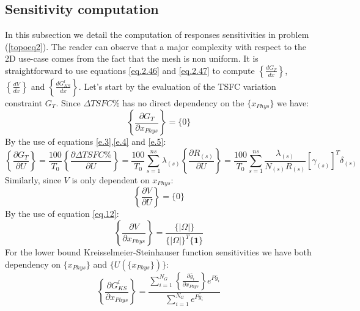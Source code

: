  \subsection{Sensitivity computation}
 \label{subsec2.4}
 In this subsection we detail the computation of responses sensitivities in problem (\ref{topoeq2}). The reader can observe that a major complexity with respect to the 2D use-case comes from the fact that the mesh is non uniform.
  It is straightforward to use equations \eqref{eq.2.46} and \eqref{eq.2.47} to compute $\left\lbrace\frac{d G_T}{dx}\right\rbrace$, $\left\lbrace\frac{d V}{dx}\right\rbrace$ and $\left\lbrace\frac{d G_{KS}^l}{dx}\right\rbrace$. Let's start by the evaluation of the TSFC variation constraint $G_T$. Since $ \Delta TSFC \%$ has no direct dependency on the $\lbrace x_{Phys}\rbrace$ we have:
    \begin{equation}
   \left \lbrace\frac{\partial G_T}{\partial x_{Phys}}\right \rbrace=\lbrace 0\rbrace 
    \end{equation}
     By the use of equations \ref{e.3},\ref{e.4} and \ref{e.5}:
    \begin{equation}
      \left \lbrace\frac{\partial G_T}{\partial U}\right \rbrace=\frac{100 }{T_0}\left \lbrace\frac{\partial \Delta TSFC \%}{\partial U}\right \rbrace =\frac{100 }{T_0}\sum_{s=1}^{ns}\lambda_{(s)}\left \lbrace\frac{\partial R_{(s)}}{\partial U}\right \rbrace=\frac{100}{T_0}\sum_{s=1}^{ns}\frac{\lambda_{(s)}}{N_{(s)}R_{(s)}}\left[\gamma_{(s)}\right] ^T\delta_{(s)}
       \end{equation}
       Similarly, since $V$ is only dependent on $x_{Phys}$:
 \begin{equation}
           \left\lbrace\frac{\partial V}{\partial U}\right\rbrace=\lbrace 0\rbrace 
 \end{equation}
 By the use of equation \eqref{eq.12}:
    \begin{equation}
                     \left\lbrace\frac{\partial V}{\partial x_{Phys}}\right\rbrace=\frac{\lbrace|\Omega|\rbrace}{\lbrace|\Omega|\rbrace^T\lbrace \mathbf{1}\rbrace}
     \end{equation}
 For the lower bound Kreisselmeier-Steinhauser
 function sensitivities we have both dependency on $\lbrace x_{Phys}\rbrace$ and $\lbrace U (\lbrace x_{Phys}\rbrace) \rbrace$: 
   \begin{equation}
   \left\lbrace\frac{\partial G^{l}_{KS}}{\partial x_{Phys}}\right\rbrace=\frac{\sum_{i=1}^{N_G}\left\lbrace\frac{\partial \bar{g}_i}{\partial x_{Phys}}\right \rbrace e^{P\bar{g}_i}}{\sum_{i=1}^{N_G}e^{P\bar{g}_i}}
   \end{equation}
